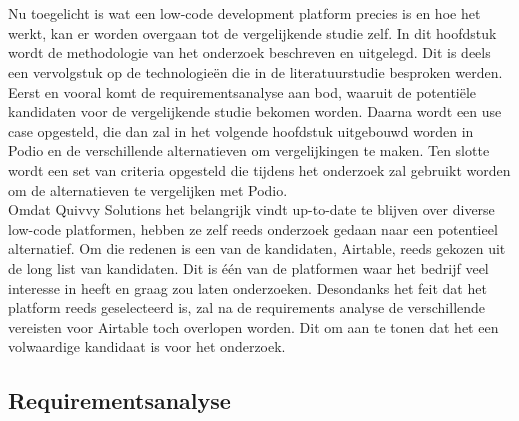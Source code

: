 
\chapter{}%
\label{ch:methodologie}



Nu toegelicht is wat een low-code development platform precies is en hoe het werkt, kan er worden overgaan tot de vergelijkende studie zelf. In dit hoofdstuk wordt de methodologie van het onderzoek beschreven en uitgelegd. Dit is deels een vervolgstuk op de technologieën die in de literatuurstudie besproken werden. Eerst en vooral komt de requirementsanalyse aan bod, waaruit de potentiële kandidaten voor de vergelijkende studie bekomen worden. Daarna wordt een use case opgesteld, die dan zal in het volgende hoofdstuk uitgebouwd worden in Podio en de verschillende alternatieven om vergelijkingen te maken. Ten slotte wordt een set van criteria opgesteld die tijdens het onderzoek zal gebruikt worden om de alternatieven te vergelijken met Podio. \\

Omdat Quivvy Solutions het belangrijk vindt up-to-date te blijven over diverse low-code platformen, hebben ze zelf reeds onderzoek gedaan naar een potentieel alternatief. Om die redenen is een van de kandidaten, Airtable, reeds gekozen uit de long list van kandidaten. Dit is één van de platformen waar het bedrijf veel interesse in heeft en graag zou laten onderzoeken. Desondanks het feit dat het platform reeds geselecteerd is, zal na de requirements analyse de verschillende vereisten voor Airtable toch overlopen worden. Dit om aan te tonen dat het een volwaardige kandidaat is voor het onderzoek. \\


\section{Requirementsanalyse}
\label{sec:requirementsanalyse}

